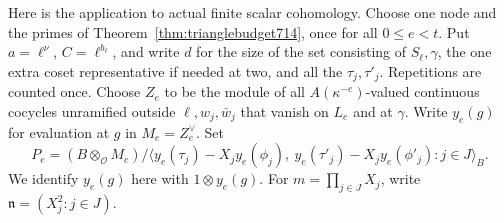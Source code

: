 \documentclass[a4paper,11pt]{article}
\theoremstyle{definition}
\theoremstyle{remark}
\numberwithin{equation}{section}
\begin{document}
Here is the application to actual finite scalar cohomology.
Choose one node and the primes of
Theorem~\ref{thm:trianglebudget714}, once for all \(0\le e<t\).
Put \(a=\ell^\nu\), \(C=\ell^{b_\ell}\), and write \(d\) for
the size of the set consisting of \(S_\ell,\gamma\), the one
extra coset representative if needed at two, and all the
\(\tau_j,\tau'_j\). Repetitions are counted once. Choose
\(Z_e\) to be the module of all \(A(\kappa^{-e})\)-valued
continuous cocycles unramified outside \(\ell,w_j,\bar w_j\)
that vanish on \(L_e\) and at \(\gamma\). Write \(y_e(g)\)
for evaluation at \(g\) in \(M_e=Z_e^\vee\). Set
\[
 P_e=(B\otimes_{\mathcal O}M_e)\Big/
   \Big\langle y_e(\tau_j)-X_jy_e(\phi_j),\
               y_e(\tau'_j)-X_jy_e(\phi'_j):j\in J\Big\rangle_B .
\]
We identify \(y_e(g)\) here with \(1\otimes y_e(g)\).
For \(m=\prod_{j\in J}X_j\), write
\(\mathfrak n=(X_j^2:j\in J)\).
\end{document}

